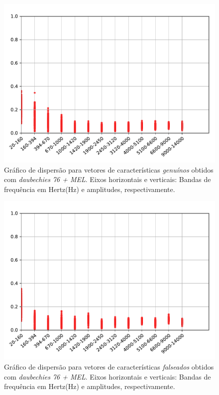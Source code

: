 \begin{figure}[H]
	\centering
	\includegraphics[scale=.8]{./images/results/barkVersusMel/Genuine_daub76_Mel.pdf}
	\caption{Gráfico de dispersão para vetores de características \textit{genuínos} obtidos com \textit{daubechies 76 + MEL}.  Eixos horizontais e verticais: Bandas de frequência em Hertz(Hz) e amplitudes, respectivamente.}
	\label{fig:livedaub76mel}
\end{figure}
\begin{figure}[H]
	\centering
	\includegraphics[scale=.8]{./images/results/barkVersusMel/Spoofing_daub76_Mel.pdf}
	\caption{Gráfico de dispersão para vetores de características \textit{falseados} obtidos com \textit{daubechies 76 + MEL}.  Eixos horizontais e verticais: Bandas de frequência em Hertz(Hz) e amplitudes, respectivamente.}
	\label{fig:spoofingdaub76mel}
\end{figure}